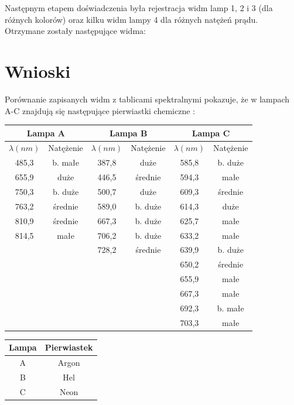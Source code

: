 \documentclass[10pt,a4paper]{article}
\newcommand{\forceindent}{\leavevmode{\parindent=3em\indent}}
\begin{document}
\newpage
Następnym etapem doświadczenia była rejestracja widm lamp 1, 2 i 3 (dla różnych kolorów) oraz kilku widm lampy 4 dla różnych natężeń prądu. Otrzymane zostały następujące widma:\\


\section*{Wnioski}
\forceindent Porównanie zapisanych widm z tablicami spektralnymi pokazuje, że w lampach A-C znajdują się następujące pierwiastki chemiczne :
\begin{center}
\begin{tabular}{|c|c|c|c|c|c|}
\multicolumn{2}{c}{Lampa A} & \multicolumn{2}{c}{Lampa B} & \multicolumn{2}{c}{Lampa C}\\
\hline
$\lambda (nm)$ & Natężenie & $\lambda (nm)$ & Natężenie & $\lambda (nm)$ & Natężenie\\
\hline
485,3 & b. małe & 387,8 & duże & 585,8 & b. duże\\
\hline
655,9 & duże & 446,5 & średnie & 594,3 & małe \\
\hline
750,3 & b. duże & 500,7 & duże & 609,3 & średnie \\
\hline
763,2 & średnie & 589,0 & b. duże & 614,3 & duże \\
\hline
810,9 & średnie & 667,3 & b. duże & 625,7 & małe \\
\hline
814,5 & małe & 706,2 & b. duże & 633,2 & małe \\
\hline
&& 728,2 & średnie & 639,9 & b. duże \\
\hline
&&&& 650,2 & średnie \\
\hline
&&&& 655,9 & małe \\
\hline
&&&& 667,3 & małe \\
\hline
&&&& 692,3 & b. małe \\
\hline
&&&& 703,3 & małe \\
\hline

\end{tabular}
\end{center}
\begin{center}
\begin{tabular}{|c|c|}
\hline
\textbf{Lampa} & \textbf{Pierwiastek} \\
\hline
A & Argon \\
\hline
B & Hel \\
\hline
C & Neon \\
\hline
\end{tabular}
\end{center}
\end{document}
